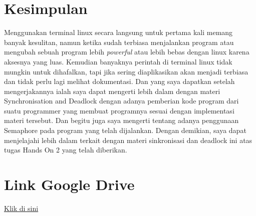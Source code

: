 \documentclass[11pt,a4paper]{article}
\begin{document}
\section{Kesimpulan}
    Menggunakan terminal linux secara langsung untuk pertama kali memang banyak kesulitan, namun ketika sudah terbiasa menjalankan program atau mengubah sebuah program lebih \textit{powerful} atau lebih bebas dengan linux karena aksesnya yang luas. Kemudian banyaknya perintah di terminal linux tidak mungkin untuk dihafalkan, tapi jika sering diaplikasikan akan menjadi terbiasa dan tidak perlu lagi melihat dokumentasi.
    Dan yang saya dapatkan setelah mengerjakannya ialah saya dapat mengerti lebih dalam
    dengan materi Synchronisation and Deadlock dengan adanya pemberian kode program dari suatu programmer
    yang membuat programnya sesuai dengan implementasi materi tersebut. Dan begitu juga saya mengerti
    tentang adanya penggunaan Semaphore pada program yang telah dijalankan. Dengan demikian, saya dapat
    menjelajahi lebih dalam terkait dengan materi sinkronisasi dan deadlock ini atas tugas Hands On 2 yang telah
    diberikan.
\section{Link Google Drive}
    \href{https://drive.google.com/drive/folders/1iAnvNA6L2OmfjI7Oc32XEHpBvSAv3ldh}{Klik di sini}
\end{document}
